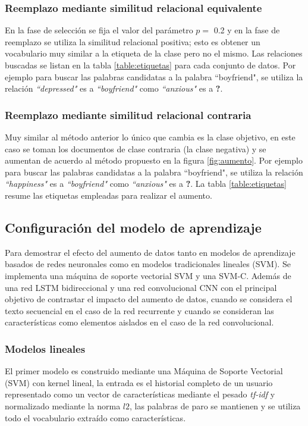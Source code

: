 \subsubsection{Reemplazo mediante similitud relacional equivalente}
En la fase de selección se fija el valor del parámetro $p=$ 0.2 y en la fase de reemplazo se utiliza la similitud relacional positiva; esto es obtener un vocabulario muy similar a la etiqueta de la clase pero no el mismo. Las relaciones buscadas se listan en la tabla \ref{table:etiquetas} para cada conjunto de datos. Por ejemplo para buscar las palabras candidatas a la palabra ``boyfriend", se utiliza la relación \textit{``depressed"} es a \textit{``boyfriend"} como \textit{``anxious"} es a \textbf{?}. 

\subsubsection{Reemplazo mediante similitud relacional contraria}
Muy similar al método anterior lo único que cambia es la clase objetivo, en este caso se toman los documentos de clase contraria (la clase negativa) y se aumentan de acuerdo al método propuesto en la figura \ref{fig:aumento}. Por ejemplo para buscar las palabras candidatas a la palabra ``boyfriend", se utiliza la relación \textit{``happiness"} es a \textit{``boyfriend"} como \textit{``anxious"} es a \textbf{?}. La tabla \ref{table:etiquetas} resume las etiquetas empleadas para realizar el aumento.



 
\subsection{Configuración del modelo de aprendizaje}

Para demostrar el efecto del aumento de datos tanto en modelos de aprendizaje basados de redes neuronales como en modelos tradicionales lineales (SVM). Se implementa una máquina de soporte vectorial SVM y una SVM-C. Además de una red LSTM bidireccional y una red convolucional CNN con el principal objetivo de contrastar el impacto del aumento de datos, cuando se considera el texto secuencial en el caso de la red recurrente y cuando se consideran las características como elementos aislados en el caso de la red convolucional.

\subsubsection{Modelos lineales}
 El primer modelo es construido mediante una Máquina de Soporte Vectorial (SVM) con kernel lineal, la entrada es el historial completo de un usuario representado como un vector de características mediante el pesado \textit{tf-idf} y normalizado mediante la norma $l2$, las palabras de paro se mantienen y se utiliza todo el vocabulario extraído como características. 
 
